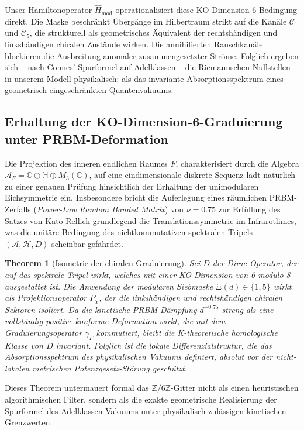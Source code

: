 \documentclass[aps,prl,preprint,superscriptaddress,floatfix]{revtex4-2}
\newtheorem{theorem}{Theorem}[section]
\newcommand{\Hilb}{\mathcal{H}}
\newcommand{\Zmod}{\mathbb{Z}/6\mathbb{Z}}
\begin{document}
Unser Hamiltonoperator $\hat{H}_{\text{mod}}$ operationalisiert diese KO-Dimension-6-Bedingung direkt. Die Maske beschränkt Übergänge im Hilbertraum strikt auf die Kanäle $\mathcal{C}_1$ und $\mathcal{C}_5$, die strukturell als geometrisches Äquivalent der rechtshändigen und linkshändigen chiralen Zustände wirken. Die annihilierten Rauschkanäle blockieren die Ausbreitung anomaler zusammengesetzter Ströme. Folglich ergeben sich – nach Connes' Spurformel auf Adelklassen \cite{Connes1999} – die Riemannschen Nullstellen in unserem Modell physikalisch: als das invariante Absorptionsspektrum eines geometrisch eingeschränkten Quantenvakuums.

\subsection{Erhaltung der KO-Dimension-6-Graduierung unter PRBM-Deformation}

Die Projektion des inneren endlichen Raumes $F$, charakterisiert durch die Algebra $\mathcal{A}_F = \mathbb{C} \oplus \mathbb{H} \oplus M_3(\mathbb{C})$, auf eine eindimensionale diskrete Sequenz lädt natürlich zu einer genauen Prüfung hinsichtlich der Erhaltung der unimodularen Eichsymmetrie ein. Insbesondere bricht die Auferlegung eines räumlichen PRBM-Zerfalls (\textit{Power-Law Random Banded Matrix}) von $\nu = 0.75$ zur Erfüllung des Satzes von Kato-Rellich grundlegend die Translationssymmetrie im Infrarotlimes, was die unitäre Bedingung des nichtkommutativen spektralen Tripels $(\mathcal{A}, \Hilb, D)$ scheinbar gefährdet.

\begin{theorem}[Isometrie der chiralen Graduierung]
\label{thm:dirac_isometry}
Sei $D$ der Dirac-Operator, der auf das spektrale Tripel wirkt, welches mit einer KO-Dimension von 6 modulo 8 ausgestattet ist. Die Anwendung der modularen Siebmaske $\Xi(d) \in \{1,5\}$ wirkt als Projektionsoperator $P_{\chi}$, der die linkshändigen und rechtshändigen chiralen Sektoren isoliert. Da die kinetische PRBM-Dämpfung $d^{-0.75}$ streng als eine vollständig positive konforme Deformation wirkt, die mit dem Graduierungsoperator $\gamma_F$ kommutiert, bleibt die K-theoretische homologische Klasse von $D$ invariant. Folglich ist die lokale Differenzialstruktur, die das Absorptionsspektrum des physikalischen Vakuums definiert, absolut vor der nicht-lokalen metrischen Potenzgesetz-Störung geschützt.
\end{theorem}

Dieses Theorem untermauert formal das $\Zmod$-Gitter nicht als einen heuristischen algorithmischen Filter, sondern als die exakte geometrische Realisierung der Spurformel des Adelklassen-Vakuums unter physikalisch zulässigen kinetischen Grenzwerten.
\end{document}
